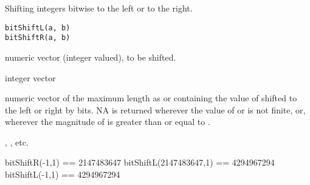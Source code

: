 \begin{Description}\relax
Shifting integers bitwise to the left or to the right.
\end{Description}
\begin{Usage}
\begin{verbatim}
bitShiftL(a, b)
bitShiftR(a, b)
\end{verbatim}
\end{Usage}
\begin{Arguments}
\begin{ldescription}
\item[\code{a}] numeric vector (integer valued), to be shifted.
\item[\code{b}] integer vector 
\end{ldescription}
\end{Arguments}
\begin{Value}
numeric vector of the maximum length as  or  containing
the value of  shifted to the left or right by  bits.
NA is returned wherever the value of  or  is not finite,
or, wherever the magnitude of  is greater than or equal to
.
\end{Value}
\begin{SeeAlso}\relax
{}, , etc.
\end{SeeAlso}
\begin{Examples}
\begin{ExampleCode}
  bitShiftR(-1,1) == 2147483647
  bitShiftL(2147483647,1) == 4294967294
  bitShiftL(-1,1) == 4294967294
\end{ExampleCode}
\end{Examples}

